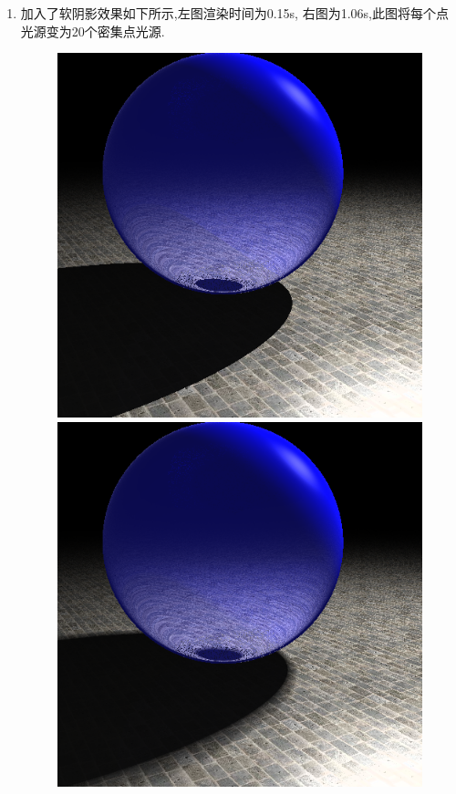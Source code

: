 \begin{enumerate}
\item 加入了软阴影效果如下所示,左图渲染时间为0.15s, 右图为1.06s,此图将每个点光源变为20个密集点光源.
\begin{figure}[H]
\begin{minipage}[b]{0.46\linewidth}
  \centering
  \includegraphics[width=\textwidth]{img/no_soft.png}
\end{minipage}
\begin{minipage}[b]{0.46\linewidth}
  \centering
  \includegraphics[width=\textwidth]{img/soft.png}
\end{minipage}
  \caption*{\label{fig:soft}}
\end{figure}


\end{enumerate}

